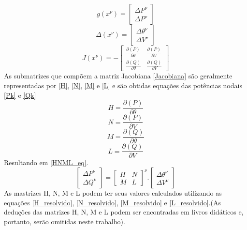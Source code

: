 \begin{equation}
   g(x^\nu) = \left[ \begin{matrix} \Delta P^\nu \\ \Delta P^\nu  \end{matrix} \right] 
    \label{g_x_nu}
\end{equation}
\begin{equation}
   \Delta (x^\nu) = \left[ \begin{matrix} \Delta \theta^\nu \\ \Delta V^\nu  \end{matrix} \right] 
    \label{delta_x_nu}
\end{equation}
\begin{equation}
   J (x^\nu) = - \left[ \begin{matrix} \frac{\partial (P)}{\partial \theta} & \frac{\partial (P)}{\partial V}  \\ \frac{\partial (Q)}{\partial \theta} & \frac{\partial (Q)}{\partial V}  \end{matrix} \right] 
    \label{Jacobiana}
\end{equation}
As submatrizes que compõem a matriz Jacobiana \ref{Jacobiana} são geralmente representadas por \ref{H}, \ref{N}, \ref{M} e \ref{L} e são obtidas equações das potências nodais \ref{Pk} e \ref{Qk}
\begin{equation}
   H = \frac{\partial (P)}{\partial \theta}
    \label{H}
\end{equation}
\begin{equation}
   N = \frac{\partial (P)}{\partial V}
    \label{N}
\end{equation}
\begin{equation}
   M = \frac{\partial (Q)}{\partial \theta}
    \label{M}
\end{equation}
\begin{equation}
   L = \frac{\partial (Q)}{\partial V}
    \label{L}
\end{equation}
Resultando em \ref{HNML_eq}.
\begin{equation}
    \left[ \begin{matrix} \Delta P^\nu \\ \Delta Q^\nu  \end{matrix} \right]  = \left[ \begin{matrix} H & N \\ M & L  \end{matrix} \right]^\nu . \left[ \begin{matrix} \Delta \theta^\nu \\ \Delta V^\nu  \end{matrix} \right] 
    \label{HNML_eq}
\end{equation}
As mastrizes H, N, M e L podem ter seus valores calculados utilizando as equações \ref{H_resolvido}, \ref{N_resolvido}, \ref{M_resolvido} e \ref{L_resolvido}.(As deduções das matrizes H, N, M e L podem ser encontradas em livros didáticos e, portanto, serão omitidas neste trabalho).\\

